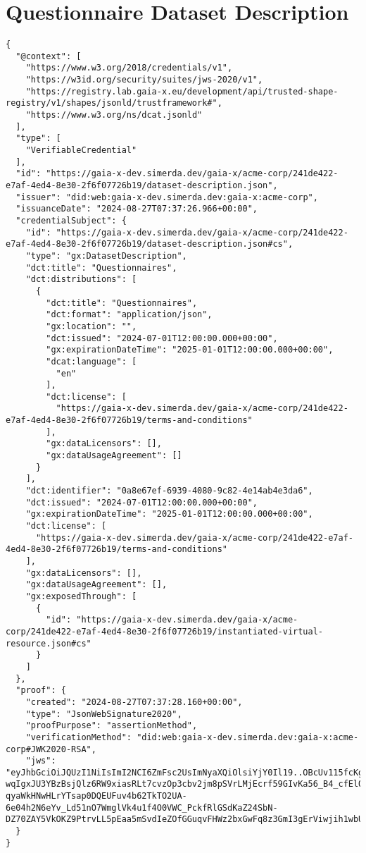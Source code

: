 \section{Questionnaire Dataset Description}

\begin{verbatim}
{
  "@context": [
    "https://www.w3.org/2018/credentials/v1",
    "https://w3id.org/security/suites/jws-2020/v1",
    "https://registry.lab.gaia-x.eu/development/api/trusted-shape-registry/v1/shapes/jsonld/trustframework#",
    "https://www.w3.org/ns/dcat.jsonld"
  ],
  "type": [
    "VerifiableCredential"
  ],
  "id": "https://gaia-x-dev.simerda.dev/gaia-x/acme-corp/241de422-e7af-4ed4-8e30-2f6f07726b19/dataset-description.json",
  "issuer": "did:web:gaia-x-dev.simerda.dev:gaia-x:acme-corp",
  "issuanceDate": "2024-08-27T07:37:26.966+00:00",
  "credentialSubject": {
    "id": "https://gaia-x-dev.simerda.dev/gaia-x/acme-corp/241de422-e7af-4ed4-8e30-2f6f07726b19/dataset-description.json#cs",
    "type": "gx:DatasetDescription",
    "dct:title": "Questionnaires",
    "dct:distributions": [
      {
        "dct:title": "Questionnaires",
        "dct:format": "application/json",
        "gx:location": "",
        "dct:issued": "2024-07-01T12:00:00.000+00:00",
        "gx:expirationDateTime": "2025-01-01T12:00:00.000+00:00",
        "dcat:language": [
          "en"
        ],
        "dct:license": [
          "https://gaia-x-dev.simerda.dev/gaia-x/acme-corp/241de422-e7af-4ed4-8e30-2f6f07726b19/terms-and-conditions"
        ],
        "gx:dataLicensors": [],
        "gx:dataUsageAgreement": []
      }
    ],
    "dct:identifier": "0a8e67ef-6939-4080-9c82-4e14ab4e3da6",
    "dct:issued": "2024-07-01T12:00:00.000+00:00",
    "gx:expirationDateTime": "2025-01-01T12:00:00.000+00:00",
    "dct:license": [
      "https://gaia-x-dev.simerda.dev/gaia-x/acme-corp/241de422-e7af-4ed4-8e30-2f6f07726b19/terms-and-conditions"
    ],
    "gx:dataLicensors": [],
    "gx:dataUsageAgreement": [],
    "gx:exposedThrough": [
      {
        "id": "https://gaia-x-dev.simerda.dev/gaia-x/acme-corp/241de422-e7af-4ed4-8e30-2f6f07726b19/instantiated-virtual-resource.json#cs"
      }
    ]
  },
  "proof": {
    "created": "2024-08-27T07:37:28.160+00:00",
    "type": "JsonWebSignature2020",
    "proofPurpose": "assertionMethod",
    "verificationMethod": "did:web:gaia-x-dev.simerda.dev:gaia-x:acme-corp#JWK2020-RSA",
    "jws": "eyJhbGciOiJQUzI1NiIsImI2NCI6ZmFsc2UsImNyaXQiOlsiYjY0Il19..OBcUv115fcKgAnvcZqbHCD-wqIgxJU3YBzBsjQlz6RW9xiasRLt7cvzOp3cbv2jm8pSVrLMjEcrf59GIvKa56_B4_cfElQL5DKvi6xwmCC8f12p9mzXfShZKFpN7xP0Q2a0YbYYuFBLvC3CHPnE32-qyaWkHNwHLrYTsap0DQEUFuv4b62TkTO2UA-6e04h2N6eYv_Ld51nO7WmglVk4u1f4O0VWC_PckfRlGSdKaZ24SbN-DZ70ZAY5VkOKZ9PtrvLL5pEaa5mSvdIeZOfGGuqvFHWz2bxGwFq8z3GmI3gErViwjih1wbUC00Pmboemadx1iAcWcH97SE8ilU7p2Q"
  }
}
\end{verbatim}

